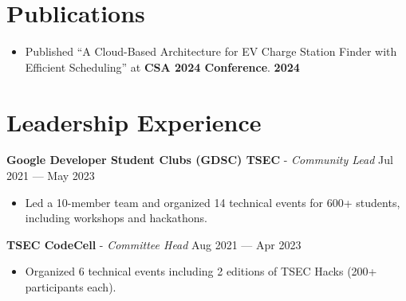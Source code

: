 \documentclass[a4,10pt]{article}
\newenvironment{zitemize}{
\begin{itemize}\itemsep0pt \parskip0pt \parsep1pt}
{\end{itemize}\vspace{-0.5cm}}
\begin{document}
\section{Publications} 
\vspace{-0.1cm}
\renewcommand\refname{\vskip -1.5em}
\nocite{*}
\begin{zitemize}
\item Published “A Cloud-Based Architecture for EV Charge Station Finder with Efficient Scheduling” at \textbf{CSA 2024 Conference}. \hfill \textbf{2024}
\end{zitemize}
\vspace{-0.2cm}


\section{Leadership Experience}

\vspace{-0.1cm}
\textbf{Google Developer Student Clubs (GDSC) TSEC} - \emph{Community Lead} \hfill Jul 2021 --- May 2023 \\
\vspace{-0.3cm}
\begin{zitemize}
    \item Led a 10-member team and organized 14 technical events for 600+ students, including workshops and hackathons.
\end{zitemize}

\vspace{0.3cm}
\textbf{TSEC CodeCell} - \emph{Committee Head} \hfill Aug 2021 --- Apr 2023 \\
\vspace{-0.3cm}
\begin{zitemize}
    \item Organized 6 technical events including 2 editions of TSEC Hacks (200+ participants each).
\end{zitemize}
\vspace{-0.1cm}
\end{document}
